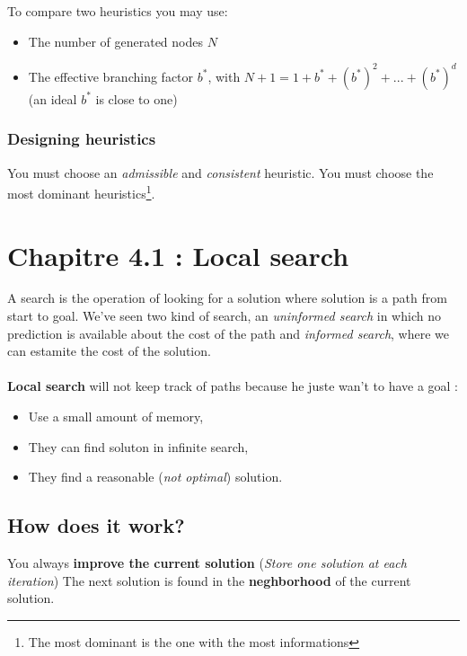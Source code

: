 To compare two heuristics you may use:
\begin{itemize}
\item The number of generated nodes $N$
\item The effective branching factor $b^*$, with $N+1 = 1 + b^* + (b^*)^2 + ... + (b^*)^d$ (an ideal $b^*$ is close to one)
\end{itemize}

\subsubsection{Designing heuristics}

You must choose an \textit{admissible} and \textit{consistent} heuristic. You must choose the most dominant heuristics\footnote{The most dominant is the one with the most informations}. 




\section{Chapitre 4.1 : Local search}

A search  is the operation of  looking for a solution  where solution is
a  path  from  start  to  goal.  We've  seen  two  kind  of  search,  an
\textit{uninformed search} in which no prediction is available about the
cost of the path and \textit{informed search}, where we can estamite
the cost of the solution.

\paragraph{ }
\textbf{Local search} will not keep track of paths because he juste wan't
to have a goal :
\begin{itemize}
    \item Use a small amount of memory,
    \item They can find soluton in infinite search,
    \item They find a reasonable (\textit{not optimal}) solution.
\end{itemize}

\subsection{How does it work?}

You always \textbf{improve the current solution} (\textit{Store one solution at each iteration})
The next solution is found in the \textbf{neghborhood} of the current solution.

